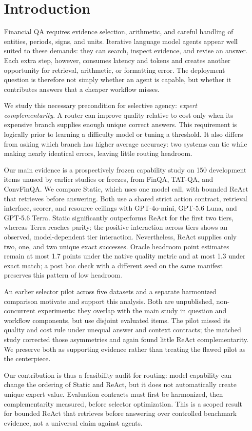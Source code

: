 \section{Introduction}

Financial QA requires evidence selection, arithmetic, and careful handling of
entities, periods, signs, and units. Iterative language model agents appear
well suited to these demands: they can search, inspect evidence, and revise an
answer. Each extra step, however, consumes latency and tokens and creates
another opportunity for retrieval, arithmetic, or formatting error. The
deployment question is therefore not simply whether an agent is capable, but
whether it contributes answers that a cheaper workflow misses.

We study this necessary precondition for selective agency: \emph{expert
complementarity}. A router can improve quality relative to cost only when its
expensive branch supplies enough unique correct answers. This requirement is
logically prior to learning a difficulty model or tuning a threshold. It also
differs from asking which branch has higher average accuracy: two systems can
tie while making nearly identical errors, leaving little routing headroom.

Our main evidence is a prospectively frozen capability study on 150 development
items unused by earlier studies or freezes, from FinQA, TAT-QA, and ConvFinQA. We compare Static, which
uses one model call, with bounded ReAct that retrieves before answering. Both
use a shared strict action contract, retrieval interface, scorer, and resource
ceilings with GPT-4o-mini, GPT-5.6
Luna, and GPT-5.6 Terra. Static significantly outperforms ReAct for the first
two tiers, whereas Terra reaches parity; the positive interaction across tiers
shows an observed, model-dependent tier interaction. Nevertheless, ReAct supplies only two, one,
and two unique exact successes. Oracle headroom point estimates remain at most
1.7 points under the native quality metric and at most 1.3 under exact match;
a post hoc check with a different seed on the same manifest preserves this
pattern of low headroom.

An earlier selector pilot across five datasets and a separate harmonized
comparison motivate and support this analysis. Both are unpublished,
non-concurrent experiments: they overlap with the main study in question and
workflow components, but use disjoint evaluated items. The pilot missed its
quality and cost rule under unequal answer and context contracts; the matched
study corrected those asymmetries and again found little ReAct complementarity.
We preserve both as supporting evidence rather than treating the flawed pilot
as the centerpiece.

Our contribution is thus a feasibility audit for routing: model capability can
change the ordering of Static and ReAct, but it does not automatically create
unique expert value. Evaluation contracts must first be harmonized, then
complementarity measured, before selector optimization. This is a scoped result
for bounded ReAct that retrieves before answering over controlled benchmark
evidence, not a
universal claim against agents.
